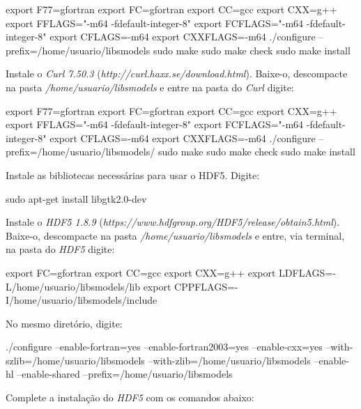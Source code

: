 \begin{bashcode}
export F77=gfortran
export FC=gfortran
export CC=gcc
export CXX=g++
export FFLAGS="-m64 -fdefault-integer-8"
export FCFLAGS="-m64 -fdefault-integer-8"
export CFLAGS=-m64
export CXXFLAGS=-m64
./configure --prefix=/home/usuario/libsmodels
sudo make
sudo make check
sudo make install
\end{bashcode}
\bigskip

\noindent Instale o \textit{Curl 7.50.3} (\textcolor{bleu_cite}{\textit{http://curl.haxx.se/download.html}}). Baixe-o, descompacte na pasta \textit{/home/usuario/libsmodels} e entre na pasta do \textit{Curl} digite:
\bigskip

\begin{bashcode}
export F77=gfortran
export FC=gfortran
export CC=gcc
export CXX=g++
export FFLAGS="-m64 -fdefault-integer-8"
export FCFLAGS="-m64 -fdefault-integer-8"
export CFLAGS=-m64
export CXXFLAGS=-m64
./configure --prefix=/home/usuario/libsmodels/
sudo make
sudo make check
sudo make install
\end{bashcode}
\bigskip

\noindent Instale as bibliotecas necessárias para usar o HDF5. Digite:
\bigskip

\begin{bashcode}
sudo apt-get install libgtk2.0-dev
\end{bashcode}
\bigskip

\noindent Instale o \textit{HDF5 1.8.9} (\textcolor{bleu_cite}{\textit{https://www.hdfgroup.org/HDF5/release/obtain5.html}}). Baixe-o, descompacte na pasta \textit{/home/usuario/libsmodels} e entre, via terminal, na pasta do \textit{HDF5} digite:
\bigskip

\begin{bashcode}
export FC=gfortran
export CC=gcc
export CXX=g++
export LDFLAGS=-L/home/usuario/libsmodels/lib
export CPPFLAGS=-I/home/usuario/libsmodels/include
\end{bashcode}
\bigskip

\noindent No mesmo diretório, digite:
\bigskip

\begin{bashcode}[fontsize=\footnotesize]
./configure --enable-fortran=yes --enable-fortran2003=yes --enable-cxx=yes
--with-szlib=/home/usuario/libsmodels --with-zlib=/home/usuario/libsmodels --enable-hl
--enable-shared --prefix=/home/usuario/libsmodels
\end{bashcode}
\bigskip

\noindent Complete a instalação do \textit{HDF5} com os comandos abaixo:
\bigskip

